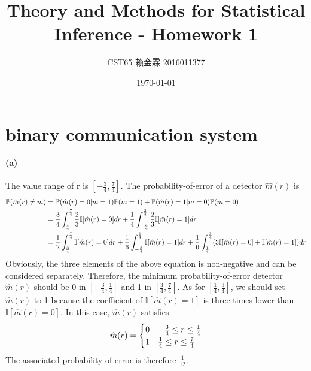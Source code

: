 \documentclass{article}
\title{Theory and Methods for Statistical Inference - Homework 1}
\author{CST65 赖金霖 2016011377}
\date{\today}
\begin{document}
\maketitle    
\section{binary communication system}
\paragraph{(a)}
The value range of r is $[-\frac{3}{4},\frac{7}{4}]$. 
The probability-of-error of a detector $\hat{m}(r)$ is
\begin{align}
\mathbb{P}(\hat{m}(r)\neq m) &= \mathbb{P}(\hat{m}(r)=0| m=1)\mathbb{P}(m=1)+\mathbb{P}(\hat{m}(r)=1| m=0)\mathbb{P}(m=0) \notag\\
&= \frac{3}{4}\int^{\frac{7}{4}}_{\frac{1}{4}}\frac{2}{3}\mathbb{I}[\hat{m}(r)=0]dr+\frac{1}{4}\int^{\frac{3}{4}}_{-\frac{3}{4}}\frac{2}{3}\mathbb{I}[\hat{m}(r)=1]dr\notag\\
&=\frac{1}{2}\int^{\frac{7}{4}}_{\frac{3}{4}}\mathbb{I}[\hat{m}(r)=0]dr+\frac{1}{6}\int^{\frac{1}{4}}_{-\frac{3}{4}}\mathbb{I}[\hat{m}(r)=1]dr+\frac{1}{6}\int^{\frac{3}{4}}_{\frac{1}{4}}(3\mathbb{I}[\hat{m}(r)=0]+\mathbb{I}[\hat{m}(r)=1])dr\notag
\end{align}
Obviously, the three elements of the above equation is non-negative and can be considered separately. Therefore, the minimum probability-of-error detector $\hat{m}(r)$ should be 0 in $[-\frac{3}{4},\frac{1}{4}]$ and 1 in $[\frac{3}{4},\frac{7}{4}]$. As for $[\frac{1}{4},\frac{3}{4}]$, we should set $\hat{m}(r)$ to 1 because the coefficient of $\mathbb{I}[\hat{m}(r)=1]$ is three times lower than $\mathbb{I}[\hat{m}(r)=0]$. In this case, $\hat{m}(r)$ satisfies
\begin{align}
	\hat{m}(r)=\begin{cases}
		0 & -\frac{3}{4}\le r\le \frac{1}{4}\\
		1 & \frac{1}{4}\le r\le \frac{7}{4}
	\end{cases}\notag
\end{align}
The associated probability of error is therefore $\frac{1}{12}$.
\end{document}
